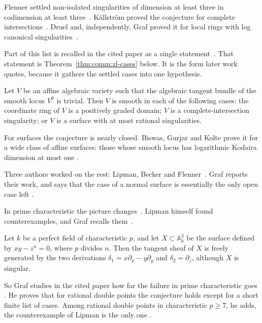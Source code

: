 Flenner settled non-isolated singularities of dimension at least three in
codimension at least three~\cite[p.~270]{BiswasGurjarKolte2014}. Källström
proved the conjecture for complete
intersections~\cite[p.~270]{BiswasGurjarKolte2014}. Druel and, independently,
Graf proved it for local rings with log canonical
singularities~\cite[p.~270]{BiswasGurjarKolte2014}.

Part of this list is recalled in the cited paper as a single
statement~\cite[Theorem~2.2, pp.~272--273]{BiswasGurjarKolte2014}. That
statement is Theorem~\ref{thm:comm:zl-cases} below. It is the form later work
quotes, because it gathers the settled cases into one hypothesis.

\begin{theorem}\label{thm:comm:zl-cases}
Let $V$ be an affine algebraic variety such that the algebraic tangent
bundle of the smooth locus $V^0$ is trivial. Then $V$ is smooth in each of
the following cases: the coordinate ring of $V$ is a positively graded
domain; $V$ is a complete-intersection singularity; or $V$ is a surface with
at most rational singularities.
\end{theorem}

For surfaces the conjecture is nearly closed. Biswas, Gurjar and Kolte prove
it for a wide class of affine surfaces: those whose smooth locus has
logarithmic Kodaira dimension at most one
\cite[Theorem~1.2, p.~270]{BiswasGurjarKolte2014}.

Three authors worked on the rest: Lipman, Becker and
Flenner~\cite[p.~115]{Graf2022LZPosChar}. Graf reports their work, and says
that the case of a normal surface is essentially the only open case left
\cite[p.~115]{Graf2022LZPosChar}.

In prime characteristic the picture
changes~\cite[p.~115]{Graf2022LZPosChar}. Lipman himself found counterexamples,
and Graf recalls them~\cite[p.~116]{Graf2022LZPosChar}.

\begin{example}\label{ex:comm:lipman}
Let $k$ be a perfect field of characteristic $p$, and let
$X\subset\mathbb{A}^3_k$ be the surface defined by $xy - z^n = 0$, where $p$
divides $n$. Then the tangent sheaf of $X$ is freely generated by the two
derivations $\delta_1 = x\partial_x - y\partial_y$ and
$\delta_2 = \partial_z$, although $X$ is singular.
\end{example}

So Graf studies in the cited paper how far the failure in prime characteristic
goes \cite[p.~115]{Graf2022LZPosChar}. He proves that for rational double
points the conjecture holds except for a short finite list of cases. Among
rational double points in characteristic $p \ge 7$, he adds, the counterexample
of Lipman is the only one \cite[p.~115]{Graf2022LZPosChar}.

